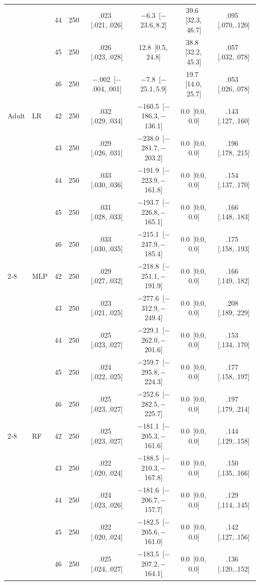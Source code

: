 \begin{table}[t]
\begin{tabular}{llrr cccc}
 &  & 44 & 250 & .023 \,[.021,\,.026] & $-$6.3 \,[$-$23.6,\,8.2] & 39.6 \,[32.3,\,46.7] & .095 \,[.070,\,.120] \\
 &  & 45 & 250 & .026 \,[.023,\,.028] & 12.8 \,[0.5,\,24.8] & 38.8 \,[32.2,\,45.3] & .057 \,[.032,\,.078] \\
 &  & 46 & 250 & $-$.002 \,[$-$.004,\,.001] & $-$7.8 \,[$-$25.1,\,5.9] & 19.7 \,[14.0,\,25.7] & .053 \,[.026,\,.078] \\
\hline
Adult & LR & 42 & 250 & .032 \,[.029,\,.034] & $-$160.5 \,[$-$186.3,\,$-$136.1] & 0.0 \,[0.0,\,0.0] & .143 \,[.127,\,.160] \\
 &  & 43 & 250 & .029 \,[.026,\,.031] & $-$238.0 \,[$-$281.7,\,$-$203.2] & 0.0 \,[0.0,\,0.0] & .196 \,[.178,\,.215] \\
 &  & 44 & 250 & .033 \,[.030,\,.036] & $-$191.9 \,[$-$223.9,\,$-$161.8] & 0.0 \,[0.0,\,0.0] & .154 \,[.137,\,.170] \\
 &  & 45 & 250 & .031 \,[.028,\,.033] & $-$193.7 \,[$-$226.8,\,$-$165.1] & 0.0 \,[0.0,\,0.0] & .166 \,[.148,\,.183] \\
 &  & 46 & 250 & .033 \,[.030,\,.035] & $-$215.1 \,[$-$247.9,\,$-$185.4] & 0.0 \,[0.0,\,0.0] & .175 \,[.158,\,.193] \\
\cline{2-8}
 & MLP & 42 & 250 & .029 \,[.027,\,.032] & $-$218.8 \,[$-$251.1,\,$-$191.9] & 0.0 \,[0.0,\,0.0] & .166 \,[.149,\,.182] \\
 &  & 43 & 250 & .023 \,[.021,\,.025] & $-$277.6 \,[$-$312.9,\,$-$249.4] & 0.0 \,[0.0,\,0.0] & .208 \,[.189,\,.229] \\
 &  & 44 & 250 & .025 \,[.023,\,.027] & $-$229.1 \,[$-$262.0,\,$-$201.6] & 0.0 \,[0.0,\,0.0] & .153 \,[.134,\,.170] \\
 &  & 45 & 250 & .024 \,[.022,\,.025] & $-$259.7 \,[$-$295.8,\,$-$224.3] & 0.0 \,[0.0,\,0.0] & .177 \,[.158,\,.197] \\
 &  & 46 & 250 & .025 \,[.023,\,.027] & $-$252.6 \,[$-$282.5,\,$-$225.7] & 0.0 \,[0.0,\,0.0] & .197 \,[.179,\,.214] \\
\cline{2-8}
 & RF & 42 & 250 & .025 \,[.023,\,.027] & $-$181.1 \,[$-$205.3,\,$-$161.6] & 0.0 \,[0.0,\,0.0] & .144 \,[.129,\,.158] \\
 &  & 43 & 250 & .022 \,[.020,\,.024] & $-$188.5 \,[$-$210.3,\,$-$167.8] & 0.0 \,[0.0,\,0.0] & .150 \,[.135,\,.166] \\
 &  & 44 & 250 & .024 \,[.023,\,.026] & $-$181.6 \,[$-$206.7,\,$-$157.7] & 0.0 \,[0.0,\,0.0] & .129 \,[.114,\,.145] \\
 &  & 45 & 250 & .022 \,[.020,\,.024] & $-$182.5 \,[$-$205.6,\,$-$161.0] & 0.0 \,[0.0,\,0.0] & .142 \,[.127,\,.156] \\
 &  & 46 & 250 & .025 \,[.024,\,.027] & $-$183.5 \,[$-$207.2,\,$-$164.1] & 0.0 \,[0.0,\,0.0] & .136 \,[.120,\,.152] \\
\hline
\end{tabular}
\end{table}

